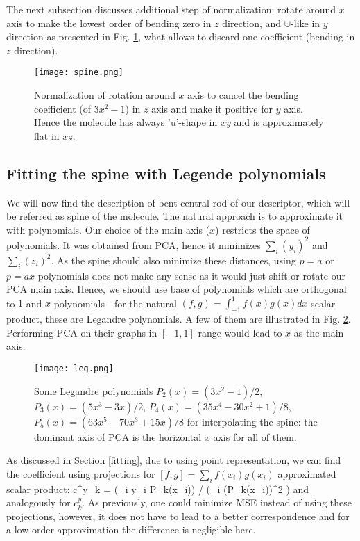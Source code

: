 \documentclass[10pt,journal]{IEEEtranTCOM}
\theoremstyle{plain}
\begin{document}
The next subsection discusses additional step of normalization: rotate around $x$ axis to make the lowest order of bending zero in $z$ direction, and $\cup$-like in $y$ direction as presented in Fig. \ref{spine}, what allows to discard one coefficient (bending in $z$ direction).

\begin{figure}[t!]
    \centering
        \texttt{[image: spine.png]}
        \caption{Normalization of rotation around $x$ axis to cancel the bending coefficient (of $3x^2-1$) in $z$ axis and make it positive for $y$ axis. Hence the molecule has always 'u'-shape in $xy$ and is approximately flat in $xz$.}
        \label{spine}
\end{figure}

\subsection{Fitting the spine with Legende polynomials}
We will now find the description of bent central rod of our descriptor, which will be referred as spine of the molecule.
The natural approach is to approximate it with polynomials. Our choice of the main axis ($x$) restricts the space of polynomials. It was obtained from PCA, hence it minimizes $\sum_i (y_i)^2$ and $\sum_i (z_i)^2$. As the spine should also minimize these distances, using $p=a$ or $p=ax$ polynomials does not make any sense as it would just shift or rotate our PCA main axis. Hence, we should use base of polynomials which are orthogonal to $1$ and $x$ polynomials - for the natural $(f,g)=\int_{-1}^1 f(x)g(x) dx$ scalar product, these are Legandre polynomials. A few of them are illustrated in Fig. \ref{leg}. Performing PCA on their graphs in $[-1,1]$ range would lead to $x$ as the main axis.

\begin{figure}[t!]
    \centering
        \texttt{[image: leg.png]}
        \caption{Some Legandre polynomials $P_2(x)=(3x^2-1)/2$, $P_3(x)=(5x^3-3x)/2$, $P_4(x)=(35x^4-30x^2+1)/8$, $P_5(x)=(63x^5-70x^3+15x)/8$ for interpolating the spine: the dominant axis of PCA is the horizontal $x$ axis for all of them.}
        \label{leg}
\end{figure}

As discussed in Section \ref{fitting}, due to using point representation, we can find the coefficient using projections for $[f,g]=\sum_i f(x_i) g(x_i)$ approximated scalar product:
\be c^y_k = \left(\sum_i y_i P_k(x_i)\right) / \left(\sum_i (P_k(x_i))^2 \right)\ee
and analogously for $c^y_k$. As previously, one could minimize MSE instead of using these projections, however, it does not have to lead to a better correspondence and for a low order approximation the difference is negligible here.
\end{document}
